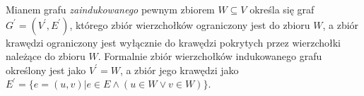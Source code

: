 \begin{definition}
  Mianem grafu \emph{zaindukowanego} pewnym zbiorem $W \subseteq V$ określa się graf $G^\prime=(V^\prime, E^\prime)$, którego zbiór wierzchołków ograniczony jest do zbioru $W$, a zbiór krawędzi ograniczony jest wyłącznie do krawędzi pokrytych przez wierzchołki należące do zbioru $W$.
  Formalnie zbiór wierzchołków indukowanego grafu określony jest jako $V^\prime = W$, a zbiór jego krawędzi jako $E^\prime=\{e=(u,v)|e\in E \land (u \in W \lor v \in W)\}$.
\end{definition}
